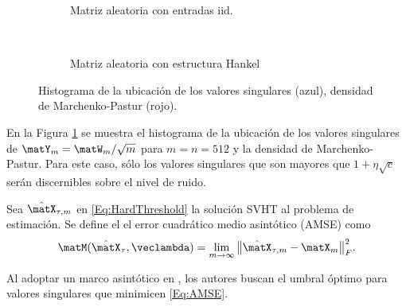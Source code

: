     \begin{figure}[t]
		\begin{subfigure}[b]{0.5\linewidth}
			\centering
			\resizebox{0.9\linewidth}{!}{}
			\caption{Matriz aleatoria con entradas iid.}
			\label{Fig:Histograma_SingularValues_iid}
		\end{subfigure}
		~
		\begin{subfigure}[b]{0.5\linewidth} 
			\centering
			\resizebox{0.9\linewidth}{!}{}
			\caption{Matriz aleatoria con estructura Hankel}
			\label{Fig:Histograma_SingularValues_Hankel}
		\end{subfigure}
		\caption{Histograma de la ubicación de los valores singulares (azul), densidad de Marchenko-Pastur (rojo).}
		\label{Fig:svd1}
	\end{figure}
    En la Figura \ref{Fig:Histograma_SingularValues_iid} se muestra el histograma de la ubicación de los valores singulares de $\matY_m = \matW_m/\sqrt{m}$ para $m=n=512$ y la densidad de Marchenko-Pastur. Para este caso, sólo los valores singulares que son mayores que $1+\eta\sqrt{c}$ serán discernibles sobre el nivel de ruido.
		
	Sea $\hat{\matX}_{\tau,m}$ en \eqref{Eq:HardThreshold} la solución SVHT al problema de estimación. Se define el el error cuadrático medio asintótico (AMSE) como
	\begin{equation}
		\matM(\hat{\matX}_{\tau}, \veclambda) = \lim\limits_{m\to\infty}\big\|\hat{\matX}_{\tau,m} - \matX_m \big\|_F^2.
		\label{Eq:AMSE}
	\end{equation}
				
	Al adoptar un marco asintótico en \cite{Gavish2014}, los autores buscan el umbral óptimo para valores singulares que minimicen \eqref{Eq:AMSE}.
			
